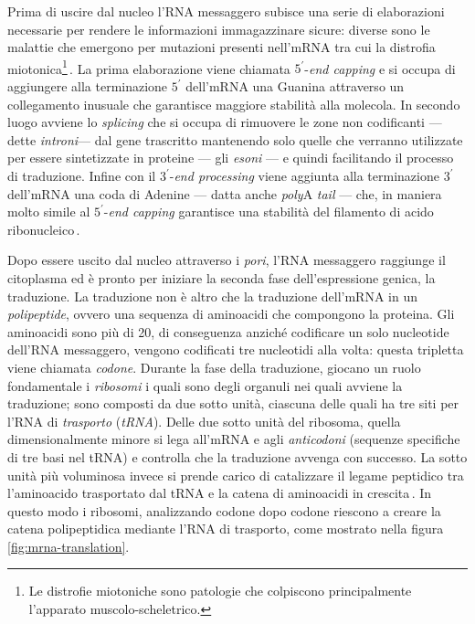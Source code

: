Prima di uscire dal nucleo l'RNA messaggero subisce una serie di elaborazioni necessarie per rendere le informazioni immagazzinare sicure: diverse sono le malattie che emergono per mutazioni presenti nell'mRNA tra cui la distrofia miotonica\footnote{Le distrofie miotoniche sono patologie che colpiscono principalmente l'apparato muscolo-scheletrico.}\,\cite{philips2000rna}. La prima elaborazione viene chiamata $5^\prime$-\textit{end capping} e si occupa di aggiungere alla terminazione $5^\prime$ dell'mRNA una Guanina attraverso un collegamento inusuale che garantisce maggiore stabilità alla molecola. In secondo luogo avviene lo \textit{splicing} che si occupa di rimuovere le zone non codificanti — dette \textsl{introni}— dal gene trascritto mantenendo solo quelle che verranno utilizzate per essere sintetizzate in proteine — gli \textsl{esoni} — e quindi facilitando il processo di traduzione. Infine con il $3^\prime$-\textit{end processing} viene aggiunta alla terminazione $3^\prime$ dell'mRNA una coda di Adenine — datta anche \textit{poly}A \textit{tail} — che, in maniera molto simile al $5^\prime$-\textit{end capping} garantisce una stabilità del filamento di acido ribonucleico\,\cite{hocine2010rna, livingstone2010mechanisms}.

Dopo essere uscito dal nucleo attraverso i \textsl{pori}, l'RNA messaggero raggiunge il citoplasma ed è pronto per iniziare la seconda fase dell'espressione genica, la traduzione. La traduzione non è altro che la traduzione dell'mRNA in un \textsl{polipeptide}, ovvero una sequenza di aminoacidi che compongono la proteina. Gli aminoacidi sono più di 20, di conseguenza anziché codificare un solo nucleotide dell'RNA messaggero, vengono codificati tre nucleotidi alla volta: questa tripletta viene chiamata \textsl{codone}. Durante la fase della traduzione, giocano un ruolo fondamentale i \textsl{ribosomi} i quali sono degli organuli nei quali avviene la traduzione; sono composti da due sotto unità, ciascuna delle quali ha tre siti per l'RNA di \textsl{trasporto} (\textsl{tRNA}). Delle due sotto unità del ribosoma, quella dimensionalmente minore si lega all'mRNA e agli \textsl{anticodoni} (sequenze specifiche di tre basi nel tRNA) e controlla che la traduzione avvenga con successo. La sotto unità più voluminosa invece si prende carico di catalizzare il legame peptidico tra l'aminoacido trasportato dal tRNA e la catena di aminoacidi in crescita\,\cite{ramakrishnan2002ribosome, lemonniermarathon, livingstone2010mechanisms}. In questo modo i ribosomi, analizzando codone dopo codone riescono a creare la catena polipeptidica mediante l'RNA di trasporto, come mostrato nella figura\,\ref{fig:mrna-translation}.

